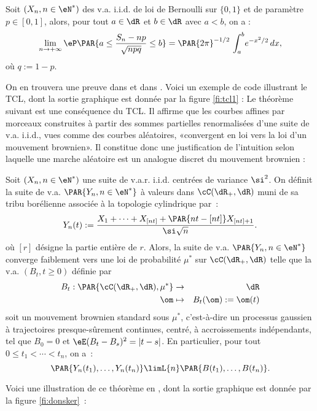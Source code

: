 \begin{theorem}\label{th:moivre-laplace}
  Soit $(X_n,n\in\eN^*)$ des v.a. i.i.d. de loi de Bernoulli sur $\{0,1\}$ et
  de paramètre $p\in[0,1]$, alors, pour tout $a\in\dR$ et $b\in\dR$ avec
  $a<b$, on a :
  $$
  \lim_{n\to+\infty}
  \eP\PAR{a\leq \frac{S_n-np}{\sqrt{npq}}\leq b} 
    =\PAR{2\pi}^{-1/2}\,\int_a^b\!e^{-x^2/2}\,dx,
  $$
  où $q:=1-p$.
\end{theorem}
On en trouvera une preuve dans \cite[cor. 8.9]{applebaum} et dans
\cite[expl. V.5.5(i) pages 145-146]{barbe-ledoux}. Voici un exemple de code
\ML{} illustrant le TCL, dont la sortie graphique est donnée par la figure
\ref{fi:tcl1} :
%
%
%
Le théorème suivant est une conséquence du TCL. Il affirme que les courbes
affines par morceaux construites à partir des sommes partielles renormalisées
d'une suite de v.a. i.i.d., vues comme des courbes aléatoires, «convergent en
loi vers la loi d'un mouvement brownien». Il constitue donc une justification
de l'intuition selon laquelle une marche aléatoire est un analogue discret du
mouvement brownien :

\begin{theorem}\label{th:pid}
  Soit $(X_n,n\in\eN^*)$ une suite de v.a.r. i.i.d. centrées de variance
  $\si^2$. On définit la suite de v.a. $\PAR{Y_n,n \in \eN^*}$ à valeurs dans
  $\cC(\dR_+,\dR)$ muni de sa tribu borélienne associée à la topologie
  cylindrique par~:
  $$
  Y_n(t):=\frac{X_1+\cdots+X_{[nt]}+\PAR{nt-[nt]}X_{[nt]+1}}{\si\sqrt{n}}.
  $$
  où $[r]$ désigne la partie entière de $r$.  Alors, la suite de v.a.
  $\PAR{Y_n,n\in\eN^*}$ converge faiblement vers une loi de probabilité $\mu^*$
  sur $\cC(\dR_+,\dR)$ telle que la v.a. $(B_t,t\geq0)$ définie par
  \begin{eqnarray*}
  B_t:\PAR{\cC(\dR_+,\dR),\mu^*}&\to&\dR\\
  \om&\mapsto&B_t(\om):=\om(t)
  \end{eqnarray*}
  soit un mouvement brownien standard sous $\mu^*$, c'est-à-dire un processus
  gaussien à trajectoires presque-sûrement continues, centré, à accroissements
  indépendants, tel que $B_0=0$ et $\eE(B_t-B_s)^2=|t-s|$.  En particulier,
  pour tout $0\leq t_1<\cdots<t_n$, on a~:
  $$
  \PAR{Y_n(t_1),\ldots,Y_n(t_n)}\limL{n}\PAR{B(t_1),\ldots,B(t_n)}.
  $$
\end{theorem}
Voici une illustration de ce théorème en \ML{}, dont la sortie graphique est
donnée par la figure \ref{fi:donsker}~:
%
%
%

